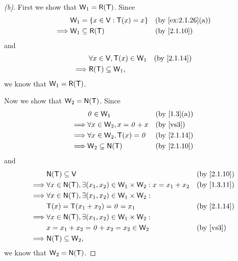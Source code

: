 \begin{proof}[(b)]
  First we show that \(\W_1 = \rg{\T}\).
  Since
  \begin{align*}
             & \W_1 = \set{x \in \V : \T(x) = x} &  & \by{ex:2.1.26}[a] \\
    \implies & \W_1 \subseteq \rg{\T}            &  & \by{2.1.10}
  \end{align*}
  and
  \begin{align*}
             & \forall x \in \V, \T(x) \in \W_1 &  & \by{2.1.14} \\
    \implies & \rg{\T} \subseteq \W_1,
  \end{align*}
  we know that \(\W_1 = \rg{\T}\).

  Now we show that \(\W_2 = \ns{\T}\).
  Since
  \begin{align*}
             & \zv \in \W_1                    &  & \by{1.3}[a]           \\
    \implies & \forall x \in \W_2, x = \zv + x &  & \text{(by \ref{vs3})} \\
    \implies & \forall x \in \W_2, \T(x) = \zv &  & \by{2.1.14}           \\
    \implies & \W_2 \subseteq \ns{\T}          &  & \by{2.1.10}
  \end{align*}
  and
  \begin{align*}
             & \ns{\T} \subseteq \V                                                           &  & \by{2.1.10}           \\
    \implies & \forall x \in \ns{\T}, \exists (x_1, x_2) \in \W_1 \times \W_2 : x = x_1 + x_2 &  & \by{1.3.11}           \\
    \implies & \forall x \in \ns{\T}, \exists (x_1, x_2) \in \W_1 \times \W_2 :                                          \\
             & \T(x) = \T(x_1 + x_2) = \zv = x_1                                              &  & \by{2.1.14}           \\
    \implies & \forall x \in \ns{\T}, \exists (x_1, x_2) \in \W_1 \times \W_2 :                                          \\
             & x = x_1 + x_2 = \zv + x_2 = x_2 \in \W_2                                       &  & \text{(by \ref{vs3})} \\
    \implies & \ns{\T} \subseteq \W_2,
  \end{align*}
  we know that \(\W_2 = \ns{\T}\).
\end{proof}


